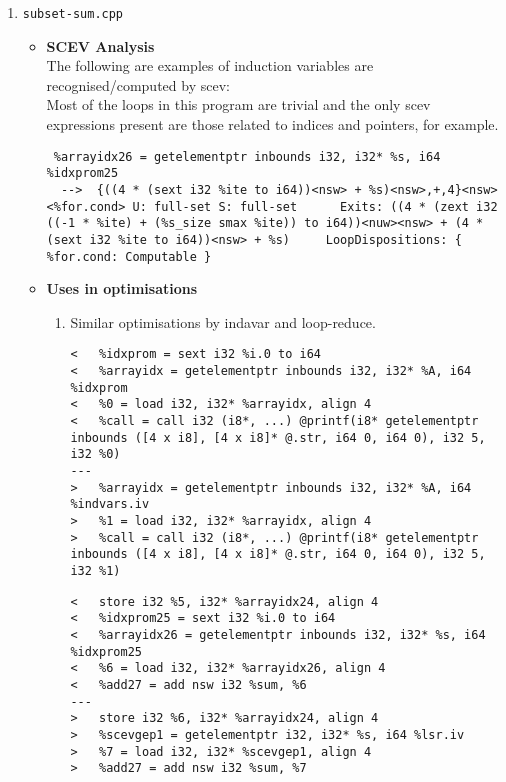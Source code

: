 \documentclass[12pt]{article}
\begin{document}
\begin{enumerate}
\begin{itemize}
\begin{enumerate}
\begin{lstlisting}
\end{lstlisting}
\end{enumerate}
\end{itemize}
\item \texttt{subset-sum.cpp}
\begin{itemize}
\item \textbf{SCEV Analysis}\\
The following are examples of induction variables are recognised/computed by scev:\\
Most of the loops in this program are trivial and the only scev expressions present are those related to indices and pointers, for example. 
\begin{lstlisting}
 %arrayidx26 = getelementptr inbounds i32, i32* %s, i64 %idxprom25
  -->  {((4 * (sext i32 %ite to i64))<nsw> + %s)<nsw>,+,4}<nsw><%for.cond> U: full-set S: full-set		Exits: ((4 * (zext i32 ((-1 * %ite) + (%s_size smax %ite)) to i64))<nuw><nsw> + (4 * (sext i32 %ite to i64))<nsw> + %s)		LoopDispositions: { %for.cond: Computable }
\end{lstlisting}
\item \textbf{Uses in optimisations}
\begin{enumerate}
\item Similar optimisations by indavar and loop-reduce.
\begin{lstlisting}
<   %idxprom = sext i32 %i.0 to i64
<   %arrayidx = getelementptr inbounds i32, i32* %A, i64 %idxprom
<   %0 = load i32, i32* %arrayidx, align 4
<   %call = call i32 (i8*, ...) @printf(i8* getelementptr inbounds ([4 x i8], [4 x i8]* @.str, i64 0, i64 0), i32 5, i32 %0)
---
>   %arrayidx = getelementptr inbounds i32, i32* %A, i64 %indvars.iv
>   %1 = load i32, i32* %arrayidx, align 4
>   %call = call i32 (i8*, ...) @printf(i8* getelementptr inbounds ([4 x i8], [4 x i8]* @.str, i64 0, i64 0), i32 5, i32 %1)
\end{lstlisting}
\begin{lstlisting}
<   store i32 %5, i32* %arrayidx24, align 4
<   %idxprom25 = sext i32 %i.0 to i64
<   %arrayidx26 = getelementptr inbounds i32, i32* %s, i64 %idxprom25
<   %6 = load i32, i32* %arrayidx26, align 4
<   %add27 = add nsw i32 %sum, %6
---
>   store i32 %6, i32* %arrayidx24, align 4
>   %scevgep1 = getelementptr i32, i32* %s, i64 %lsr.iv
>   %7 = load i32, i32* %scevgep1, align 4
>   %add27 = add nsw i32 %sum, %7


\end{lstlisting}
\end{enumerate}
\end{itemize}
\end{enumerate}
\end{document}
